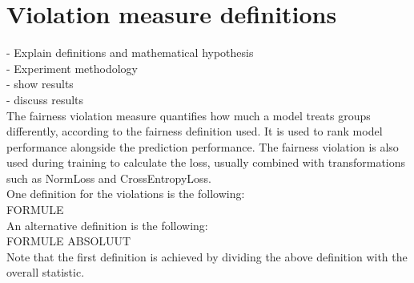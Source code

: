\chapter{Violation measure definitions}
- Explain definitions and mathematical hypothesis\\
- Experiment methodology\\
- show results\\
- discuss results\\
The fairness violation measure quantifies how much a model treats groups differently, according to the fairness definition used. It is used to rank model performance alongside the prediction performance. The fairness violation is also used during training to calculate the loss, usually combined with transformations such as NormLoss and CrossEntropyLoss.\\
One definition for the violations is the following:\\
FORMULE
\\
An alternative definition is the following:\\
FORMULE ABSOLUUT
\\
Note that the first definition is achieved by dividing the above definition with the overall statistic.